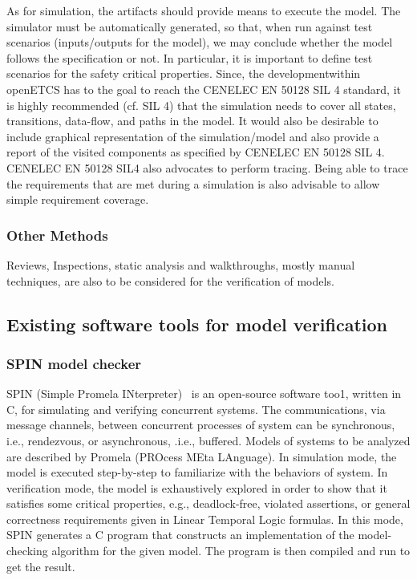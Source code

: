 \documentclass{template/openetcs_article}
\begin{document}
As for simulation, the artifacts should provide means to execute the model.  The simulator must be automatically generated, so that, when run against test scenarios (inputs/outputs for the model), we may conclude whether the model follows the specification or not. In particular, it is important to define test scenarios for the safety critical properties. Since, the developmentwithin openETCS has to the goal to reach the CENELEC EN 50128 SIL 4 standard, it is highly recommended (cf. SIL 4) that the simulation needs to cover all states, transitions, data-flow, and paths in the model. It would also be desirable to include graphical representation of the simulation/model and also provide a report of the visited components as specified by CENELEC EN 50128 SIL 4. CENELEC EN 50128 SIL4 also advocates to perform tracing. Being able to trace the requirements that are met during a simulation is also advisable to allow simple requirement coverage.

\subsubsection{Other Methods}

Reviews, Inspections, static analysis and walkthroughs, mostly manual techniques, are also to be considered for the verification of models. 

\subsection{Existing software tools for model verification}\label{sec4}

\subsubsection{SPIN model checker}

SPIN (Simple Promela INterpreter)~\cite{Holzmann97} is an open-source software too1, written in C, for simulating and verifying concurrent systems. The communications, via message channels, between concurrent processes of system can be synchronous, i.e., rendezvous, or asynchronous, .i.e., buffered. Models of systems to be analyzed are described by Promela (PROcess MEta LAnguage). In simulation mode, the model is executed step-by-step to familiarize with the behaviors of system. In verification mode, the model is exhaustively explored in order to show that it satisfies some critical properties, e.g., deadlock-free, violated assertions, or general correctness requirements given in Linear Temporal Logic formulas. In this mode, SPIN generates a C program that constructs an implementation of the model-checking algorithm for the given model. The program is then compiled and run to get the result.
\end{document}
